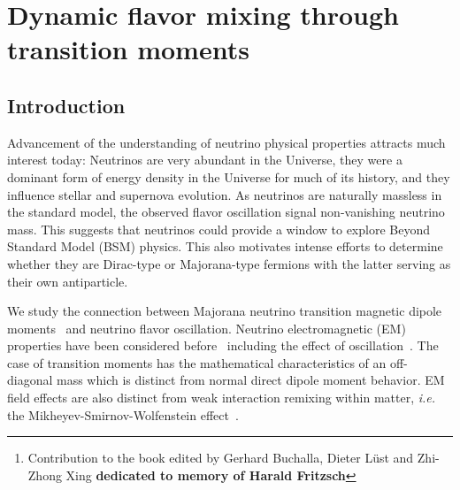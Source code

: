 \documentclass[addchapnum]{ws-rv961x669} %
\begin{document}
\chapter[Dynamic flavor mixing through transition moments]{\label{JR_ch1}Dynamic flavor mixing through transition moments}

\author[J. Rafelski, A. Steinmetz, and C. T. Yang]{Johann Rafelski, Andrew Steinmetz, and Cheng Tao Yang}

\address{Department of Physics, The University of Arizona, Tucson, AZ 85721, USA}

\begin{abstract} 
We show that Majorana neutrino flavor mixing can be driven by transition dipole moments in the presence of external electromagnetic fields. We demonstrate the sensitivity of the rotation mixing matrix to strong fields obtaining effective mass eigenstates in the two-flavor model.\footnote{Contribution to the book edited by Gerhard Buchalla, Dieter L\"ust
and Zhi-Zhong Xing \textbf{dedicated to memory of Harald Fritzsch}}
\end{abstract}


\body


\section{Introduction}
\label{sec:intro}

Advancement of the understanding of neutrino physical properties attracts much interest today: Neutrinos are very abundant in the Universe, they were a dominant form of energy density in the Universe for much of its history, and they influence stellar and supernova evolution. As neutrinos are naturally massless in the standard model, the observed flavor oscillation signal non-vanishing neutrino mass. This suggests that neutrinos could provide a window to explore Beyond Standard Model (BSM) physics. This also motivates intense efforts to determine whether they are Dirac-type or Majorana-type fermions with the latter serving as their own antiparticle.

We study the connection between Majorana neutrino transition magnetic dipole moments~\cite{Fujikawa:1980yx,Shrock:1980vy,Shrock:1982sc} and neutrino flavor oscillation. Neutrino electromagnetic (EM) properties have been considered before~\cite{Schechter:1981hw,Giunti:2014ixa,Chukhnova:2019oum,Popov:2019nkr} including the effect of oscillation~\cite{Pal:1991pm,Elizalde:2004mw}. The case of transition moments has the mathematical characteristics of an off-diagonal mass which is distinct from normal direct dipole moment behavior. EM field effects are also distinct from weak interaction remixing within matter, {\it i.e.\/} the Mikheyev-Smirnov-Wolfenstein effect~\citep{Wolfenstein:1977ue,Mikheyev:1985zog,Smirnov:2003da}.
\end{document}
